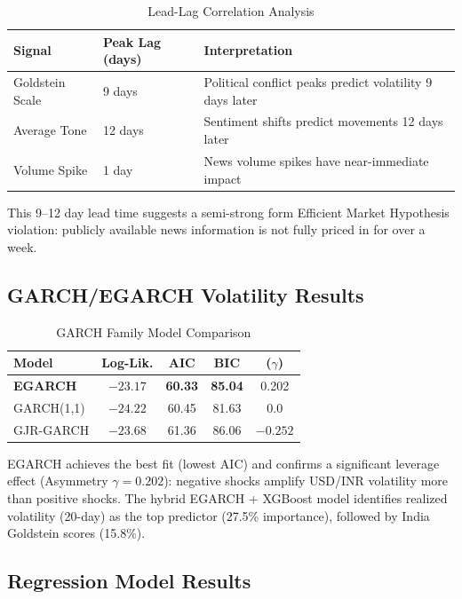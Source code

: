 \documentclass[11pt]{article}
\begin{document}
\begin{table}[H]
\centering
\small
\caption{Lead-Lag Correlation Analysis}
\label{tab:leadlag}
\begin{tabular}{lll}
\toprule
\textbf{Signal} & \textbf{Peak Lag (days)} & \textbf{Interpretation} \\
\midrule
Goldstein Scale & 9 days & Political conflict peaks predict volatility 9 days later \\
Average Tone & 12 days & Sentiment shifts predict movements 12 days later \\
Volume Spike & 1 day & News volume spikes have near-immediate impact \\
\bottomrule
\end{tabular}
\end{table}

This 9--12 day lead time suggests a semi-strong form Efficient Market Hypothesis violation: publicly available news information is not fully priced in for over a week.

\subsection{GARCH/EGARCH Volatility Results}

\begin{table}[H]
\centering
\small
\caption{GARCH Family Model Comparison}
\label{tab:garch}
\begin{tabular}{lcccc}
\toprule
\textbf{Model} & \textbf{Log-Lik.} & \textbf{AIC} & \textbf{BIC} & \textbf{($\gamma$)} \\
\midrule
\textbf{EGARCH} & $-23.17$ & \textbf{60.33} & \textbf{85.04} & 0.202 \\
GARCH(1,1) & $-24.22$ & 60.45 & 81.63 & 0.0 \\
GJR-GARCH & $-23.68$ & 61.36 & 86.06 & $-0.252$ \\
\bottomrule
\end{tabular}
\end{table}

EGARCH achieves the best fit (lowest AIC) and confirms a significant leverage effect (Asymmetry $\gamma = 0.202$): negative shocks amplify USD/INR volatility more than positive shocks. The hybrid EGARCH + XGBoost model identifies realized volatility (20-day) as the top predictor (27.5\% importance), followed by India Goldstein scores (15.8\%).

\subsection{Regression Model Results}
\end{document}
